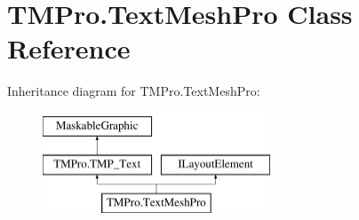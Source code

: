 \hypertarget{class_t_m_pro_1_1_text_mesh_pro}{}\section{T\+M\+Pro.\+Text\+Mesh\+Pro Class Reference}
\label{class_t_m_pro_1_1_text_mesh_pro}
Inheritance diagram for T\+M\+Pro.\+Text\+Mesh\+Pro\+:\begin{figure}[H]
\begin{center}
\leavevmode
\includegraphics[height=3.000000cm]{class_t_m_pro_1_1_text_mesh_pro}
\end{center}
\end{figure}
